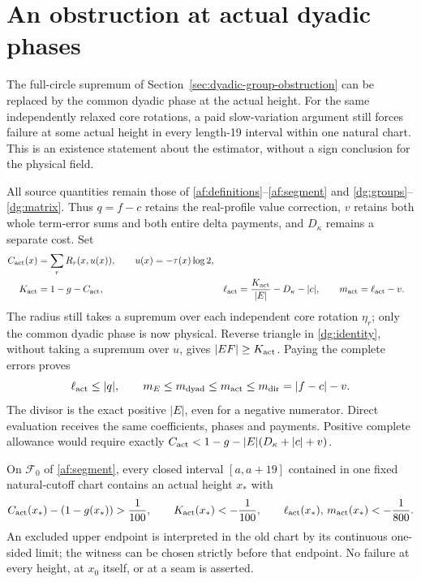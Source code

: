 \section{An obstruction at actual dyadic phases}
\label{sec:actual-phase-recurrence}

The full-circle supremum of Section~\ref{sec:dyadic-group-obstruction}
can be replaced by the common dyadic phase at the actual height.
For the same independently relaxed core rotations, a paid slow-variation
argument still forces failure at some actual height in every length-19
interval within one natural chart. This is an existence statement
about the estimator, without a sign conclusion for the physical field.

All source quantities remain those of
\eqref{af:definitions}--\eqref{af:segment} and
\eqref{dg:groups}--\eqref{dg:matrix}. Thus $q=f-c$ retains the real-profile
value correction, $v$ retains both whole term-error sums and both
entire delta payments, and $D_\kappa$ remains a separate cost. Set
\begin{align}
 C_{\rm act}(x)&=\sum_rR_r(x,u(x)),\qquad u(x)=-\tau(x)\log2,\notag\\
 K_{\rm act}&=1-g-C_{\rm act},&
 \ell_{\rm act}&=\frac{K_{\rm act}}{|E|}-D_\kappa-|c|,\qquad
 m_{\rm act}=\ell_{\rm act}-v .
 \label{ap:allowance}
\end{align}
The radius still takes a supremum over each independent core rotation
$\eta_r$; only the common dyadic phase is now physical.
Reverse triangle in \eqref{dg:identity}, without taking a supremum
over $u$, gives $|EF|\ge K_{\rm act}$. Paying the complete errors proves
\begin{equation}
 \ell_{\rm act}\le|q|,\qquad
 m_E\le m_{\rm dyad}\le m_{\rm act}
       \le m_{\rm dir}=|f-c|-v.
 \label{ap:comparison}
\end{equation}
The divisor is the exact positive $|E|$, even for a negative numerator.
Direct evaluation receives the same coefficients, phases and payments.
Positive complete allowance would require exactly
$C_{\rm act}<1-g-|E|(D_\kappa+|c|+v)$.

\begin{theorem}
\label{thm:actual-phase-recurrence}
On $\mathcal F_0$ of \eqref{af:segment}, every closed interval
$[a,a+19]$ contained in one fixed natural-cutoff chart contains an
actual height $x_*$ with
\begin{equation}
 C_{\rm act}(x_*)-(1-g(x_*))>\frac1{100},\qquad
 K_{\rm act}(x_*)<-\frac1{100},\qquad
 \ell_{\rm act}(x_*),\,m_{\rm act}(x_*)<-\frac1{800}.
 \label{ap:theorem}
\end{equation}
An excluded upper endpoint is interpreted in the old chart by its
continuous one-sided limit; the witness can be chosen strictly before
that endpoint. No failure at every height, at $x_0$ itself, or at a
seam is asserted.
\end{theorem}

